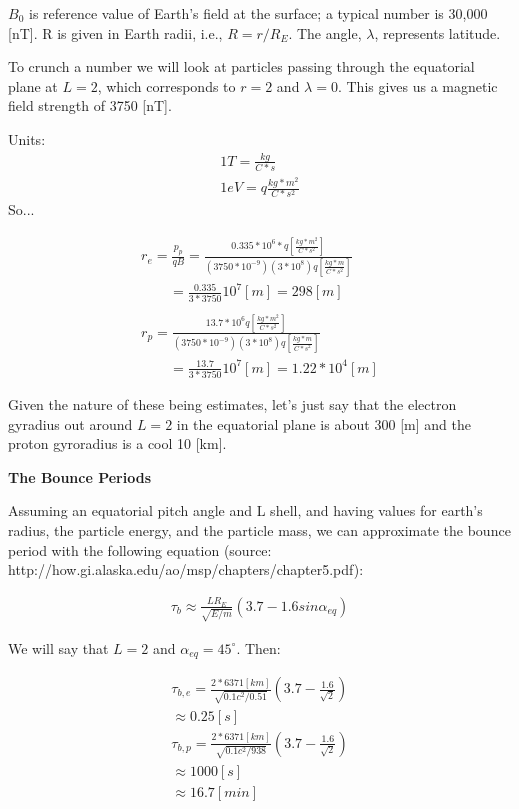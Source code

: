 $B_{0}$ is reference value of Earth's field at the surface; a typical
number is 30,000 [nT]. R is given in Earth radii, i.e., $R=r/R_{E}$. The
angle, $\lambda$, represents latitude.

To crunch a number we will look at particles passing through the
equatorial plane at $L=2$, which corresponds to $r=2$ and $\lambda=0$.
This gives us a magnetic field strength of 3750 [nT].

Units: 
\begin{gather*}
1 T = \frac{kg}{C*s}\\
1 eV = q \frac{kg*m^{2}}{C*s^{2}}
\end{gather*}
So...

\begin{gather*}
  r_{e} = \frac{p_{p}}{qB} = \frac{0.335*10^{6}*q
  [\frac{kg*m^{2}}{C*s^{2}}]}{(3750*10^{-9})(3*10^{8})q
  [\frac{kg*m}{C*s^{2}}]}\\
  \quad\quad = \frac{0.335}{3*3750}10^{7}[m] = 298  [m]\\
  \\
  r_{p} = \frac{13.7*10^{6}q
  [\frac{kg*m^{2}}{C*s^{2}}]}{(3750*10^{-9})(3*10^{8})q
  [\frac{kg*m}{C*s^{2}}]}\\
  \quad\quad = \frac{13.7}{3*3750}10^{7} [m] = 1.22*10^{4} [m]
\end{gather*}

Given the nature of these being estimates, let's just say that the
electron gyradius out around $L=2$ in the equatorial plane is about 300
[m] and the proton gyroradius is a cool 10 [km]. 

\textbf{The Bounce Periods}

Assuming an equatorial pitch angle and L shell, and having values for
earth's radius, the particle energy, and the particle mass, we can
approximate the bounce period with the following equation (source:
http://how.gi.alaska.edu/ao/msp/chapters/chapter5.pdf):

\begin{gather*}
  \tau_{b}\approx \frac{LR_{E}}{\sqrt{E/m}}(3.7-1.6sin\alpha_{eq})
\end{gather*}

We will say that $L=2$ and $\alpha_{eq}=45^{\circ}$. Then:

\begin{align*}
  \tau_{b,e} = \frac{2*6371
  [km]}{\sqrt{0.1c^{2}/0.51}}(3.7-\frac{1.6}{\sqrt{2}})\\
  \approx 0.25 [s]
   \\
   \tau_{b,p} = \frac{2*6371
   [km]}{\sqrt{0.1c^{2}/938}}(3.7-\frac{1.6}{\sqrt{2}})\\
  \approx 1000 [s] \\
  \approx 16.7 [min]
\end{align*}
